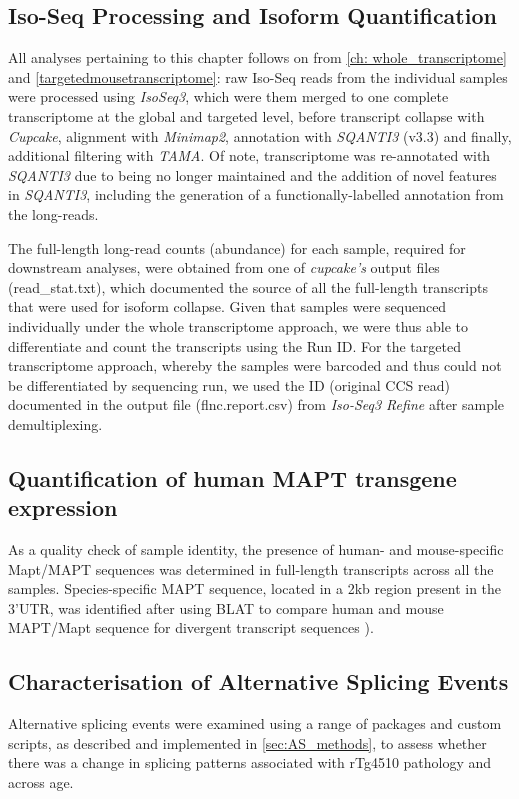 \subsection{Iso-Seq Processing and Isoform Quantification}
All analyses pertaining to this chapter follows on from \cref{ch: whole_transcriptome} and \cref{targetedmousetranscriptome}: raw Iso-Seq reads from the individual samples were processed using \textit{IsoSeq3}, which were them merged to one complete transcriptome at the global and targeted level, before transcript collapse with \textit{Cupcake}, alignment with \textit{Minimap2}, annotation with \textit{SQANTI3} (v3.3) and finally, additional filtering with \textit{TAMA}. Of note, transcriptome was re-annotated with \textit{SQANTI3} due to  being no longer maintained and the addition of novel features in \textit{SQANTI3}, including the generation of a functionally-labelled annotation from the long-reads. 

The full-length long-read counts (abundance) for each sample, required for downstream analyses, were obtained from one of \textit{cupcake's} output files (read\_stat.txt), which documented the source of all the full-length transcripts that were used for isoform collapse. Given that samples were sequenced individually under the whole transcriptome approach, we were thus able to differentiate and count the transcripts using the Run ID. For the targeted transcriptome approach, whereby the samples were barcoded and thus could not be differentiated by sequencing run, we used the ID (original CCS read) documented in the output file (flnc.report.csv) from \textit{Iso-Seq3 Refine} after sample demultiplexing. 


\subsection{Quantification of human MAPT transgene expression} 
As a quality check of sample identity, the presence of human- and mouse-specific Mapt/MAPT sequences was determined in full-length transcripts across all the samples. Species-specific MAPT sequence, located in a 2kb region present in the 3'UTR, was identified after using BLAT\cite{Kent2002} to compare human and mouse MAPT/Mapt sequence for divergent transcript sequences \cite{Castanho2020}).  

\subsection{Characterisation of Alternative Splicing Events} 
Alternative splicing events were examined using a range of packages and custom scripts, as described and implemented in \cref{sec:AS_methods}, to assess whether there was a change in splicing patterns associated with rTg4510 pathology and across age. 


